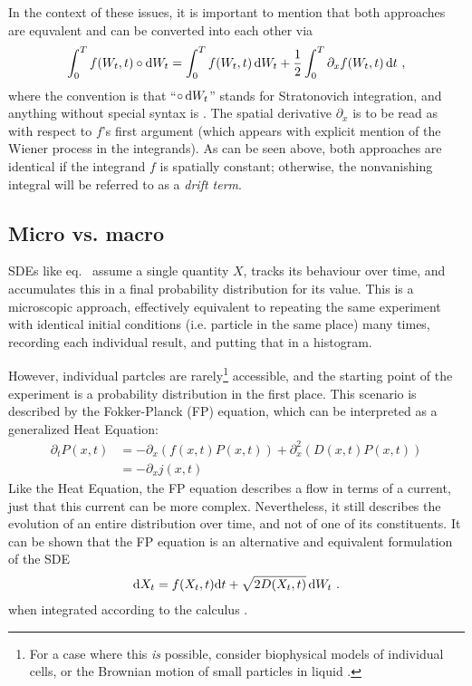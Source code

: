 %
In the context of these issues, it is important to mention that both approaches are equvalent and can be converted into each other via
%
\begin{equation}
	\int_0^Tf(W_t,t)\circ\mathrm{d} W_t
	=
	\int_0^Tf(W_t,t)\,\mathrm{d} W_t
	+
	\frac12\int_0^T \partial_xf(W_t,t)\,\mathrm{d} t ~,
\end{equation}
%
where the convention is that ``\(\circ\,\mathrm{d} W_t\)'' stands for Stratonovich integration, and anything without special syntax is \Ito{}. The spatial derivative \(\partial_x\) is to be read as with respect to \(f\)'s first argument (which appears with explicit mention of the Wiener process in the integrands). As can be seen above, both approaches are identical if the integrand \(f\) is spatially constant; otherwise, the nonvanishing integral will be referred to as a \emph{drift term}.


\subsection{Micro vs. macro}
\label{sec:fp introduction}

SDEs like eq.~ assume a single quantity \(X\), tracks its behaviour over time, and accumulates this in a final probability distribution for its value. This is a microscopic approach, effectively equivalent to repeating the same experiment with identical initial conditions (i.e. particle in the same place) many times, recording each individual result, and putting that in a histogram.

However, individual partcles are rarely\footnote{For a case where this \emph{is} possible, consider biophysical models of individual cells, or the Brownian motion of small particles in liquid \cite{sengupta}.} accessible, and the starting point of the experiment is a probability distribution in the first place. This scenario is described by the Fokker-Planck (FP) equation, which can be interpreted as a generalized Heat Equation:
%
\begin{equation}
	\label{eqn:fp}
	\begin{split}
	\partial_tP(x,t)
	&= - \partial_x (f(x,t)P(x,t)) + \partial_x^2 (D(x,t)P(x,t)) \\
	&= -\partial_xj(x,t)
	\end{split}
\end{equation}
%
Like the Heat Equation, the FP equation describes a flow in terms of a current, just that this current can be more complex. Nevertheless, it still describes the evolution of an entire distribution over time, and not of one of its constituents. It can be shown that the FP equation is an alternative and equivalent formulation of the SDE
%
\begin{align}
	\mathrm{d} X_t = f(X_t,t)\mathrm{d} t + \sqrt{2 D(X_t,t)}\,\mathrm{d} W_t ~.
\end{align}
%
when integrated according to the \Ito{} calculus \cite{sde}.




